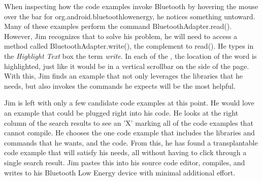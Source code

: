 When inspecting how the code examples invoke Bluetooth by hovering the mouse over the bar for org.android.bluetoothlowenergy, he notices something untoward.
Many of these examples perform the command BluetoothAdapter.read().
However, Jim recognizes that to solve his problem, he will need to access a method called BluetoothAdapter.write(), the complement to read().
He types in the \emph{Highlight Text} box the term \emph{write}.
In each of the \systemname{}, the location of the word is highlighted, just like it would be in a vertical scrollbar on the side of the page.
With this, Jim finds an example that not only leverages the libraries that he needs, but also invokes the commands he expects will be the most helpful.

Jim is left with only a few candidate code examples at this point.
He would love an example that could be plugged right into his code.
He looks at the right column of the search results to see an 'X' marking all of the code examples that cannot compile.
He chooses the one code example that includes the libraries and commands that he wants, and the code.
From this, he has found a transplantable code example that will satisfy his needs, all without having to click through a single search result.
Jim pastes this into his source code editor, compiles, and writes to his Bluetooth Low Energy device with minimal additional effort.
